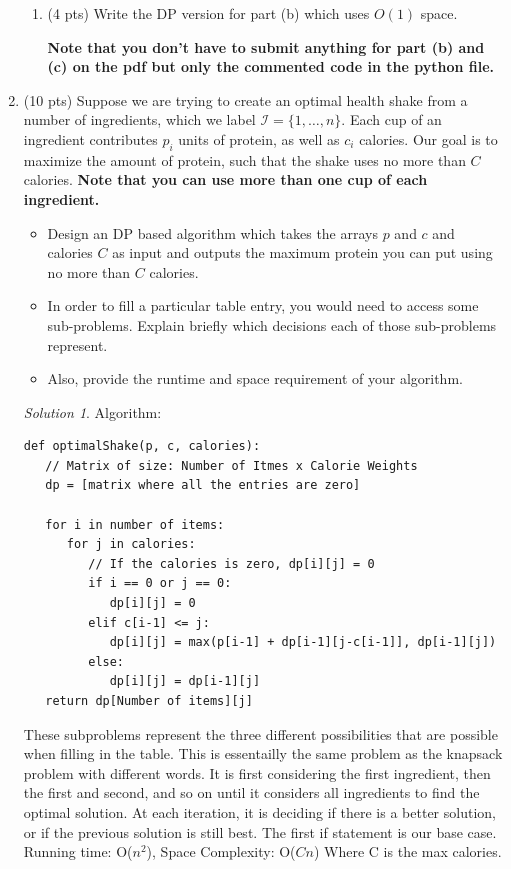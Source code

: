 \documentclass[12pt]{article}
\theoremstyle{remark}
\newtheorem*{solution}{Solution}
\begin{document}
\begin{enumerate}
\begin{enumerate}
        \item (4 pts) Write the DP version for part (b) which uses $O(1)$ space.
        
        
        \textbf{Note that you don't have to submit anything for part (b) and (c) on the pdf but only the commented code in the python file.}
    \end{enumerate}



    
    


\pagebreak



\item (10 pts) Suppose we are trying to create an optimal health shake from a number of ingredients, which we label $\mathcal{I} = \{1, \ldots, n\}$. Each cup of an ingredient contributes $p_{i}$ units of protein, as well as $c_{i}$ calories. Our goal is to maximize the amount of protein, such that the shake uses no more than $C$ calories. \textbf{Note that you can use more than one cup of each ingredient.} 
\begin{itemize}
    \item Design an DP based algorithm which takes the arrays $p$ and $c$ and calories $C$ as input and outputs the maximum protein you can put using no more than $C$ calories.
    \item In order to fill a particular table entry, you would need to access some sub-problems. Explain briefly which decisions each of those sub-problems represent.
    \item Also, provide the runtime and space requirement of your algorithm.
\end{itemize}
 
\begin{solution}Algorithm: \\
\begin{verbatim}
def optimalShake(p, c, calories):
   // Matrix of size: Number of Itmes x Calorie Weights
   dp = [matrix where all the entries are zero]

   for i in number of items:
      for j in calories:
         // If the calories is zero, dp[i][j] = 0
         if i == 0 or j == 0:
            dp[i][j] = 0
         elif c[i-1] <= j:
            dp[i][j] = max(p[i-1] + dp[i-1][j-c[i-1]], dp[i-1][j])
         else:
            dp[i][j] = dp[i-1][j]
   return dp[Number of items][j]
\end{verbatim}
These subproblems represent the three different possibilities that are possible when filling in the table. This is essentailly the same problem as the knapsack problem with different words. It is first considering the first ingredient, then the first and second, and so on until it considers all ingredients to find the optimal solution. At each iteration, it is deciding if there is a better solution, or if the previous solution is still best. The first if statement is our base case. Running time: O($n^2$), Space Complexity: O($Cn$) Where C is the max calories.
\end{solution}


\end{enumerate}
\end{document}
